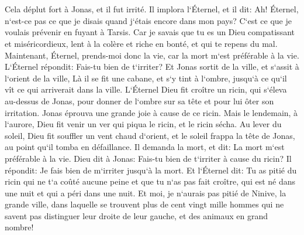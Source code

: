 \chapter{}

\verse Cela déplut fort à Jonas, et il fut irrité. 
\verse Il implora l`Éternel, et il dit: Ah! Éternel, n`est-ce pas ce que je disais quand j`étais encore dans mon pays? C`est ce que je voulais prévenir en fuyant à Tarsis. Car je savais que tu es un Dieu compatissant et miséricordieux, lent à la colère et riche en bonté, et qui te repens du mal. 
\verse Maintenant, Éternel, prends-moi donc la vie, car la mort m`est préférable à la vie. 
\verse L`Éternel répondit: Fais-tu bien de t`irriter? 
\verse Et Jonas sortit de la ville, et s`assit à l`orient de la ville, Là il se fit une cabane, et s`y tint à l`ombre, jusqu`à ce qu`il vît ce qui arriverait dans la ville. 
\verse L`Éternel Dieu fit croître un ricin, qui s`éleva au-dessus de Jonas, pour donner de l`ombre sur sa tête et pour lui ôter son irritation. Jonas éprouva une grande joie à cause de ce ricin. 
\verse Mais le lendemain, à l`aurore, Dieu fit venir un ver qui piqua le ricin, et le ricin sécha. 
\verse Au lever du soleil, Dieu fit souffler un vent chaud d`orient, et le soleil frappa la tête de Jonas, au point qu`il tomba en défaillance. Il demanda la mort, et dit: La mort m`est préférable à la vie. 
\verse Dieu dit à Jonas: Fais-tu bien de t`irriter à cause du ricin? Il répondit: Je fais bien de m`irriter jusqu`à la mort. 
\verse Et l`Éternel dit: Tu as pitié du ricin qui ne t`a coûté aucune peine et que tu n`as pas fait croître, qui est né dans une nuit et qui a péri dans une nuit. 
\verse Et moi, je n`aurais pas pitié de Ninive, la grande ville, dans laquelle se trouvent plus de cent vingt mille hommes qui ne savent pas distinguer leur droite de leur gauche, et des animaux en grand nombre! 
